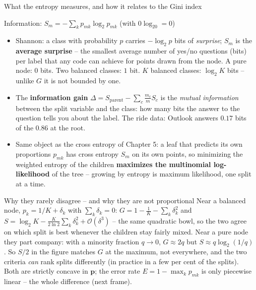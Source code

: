 \documentclass[10pt,aspectratio=169]{beamer}
\begin{document}
\begin{frame}{What the entropy measures, and how it relates to the Gini index}
\footnotesize
\begin{block}{Information: $S_m=-\sum_kp_{mk}\log_2p_{mk}$ (with $0\log_20=0$)}
\begin{itemize}
  \item Shannon: a class with probability $p$ carries $-\log_2p$ bits of
        \emph{surprise}; $S_m$ is the \textbf{average surprise} -- the
        smallest average number of yes/no questions (bits) per label that
        any code can achieve for points drawn from the node.  A pure node:
        $0$ bits.  Two balanced classes: $1$ bit.  $K$ balanced classes:
        $\log_2K$ bits -- unlike $G$ it is not bounded by one.
  \item The \textbf{information gain} $\Delta=S_{\mathrm{parent}}-\sum_c\frac{m_c}{m}S_c$
        is the \emph{mutual information} between the split variable and
        the class: how many bits the answer to the question tells you about
        the label.  The ride data: Outlook answers $0.17$ bits of the
        $0.86$ at the root.
  \item Same object as the cross entropy of Chapter 5: a leaf that predicts
        its own proportions $p_{mk}$ has cross entropy $S_m$ on its own
        points, so minimizing the weighted entropy of the children
        \textbf{maximizes the multinomial log-likelihood} of the tree --
        growing by entropy is maximum likelihood, one split at a time.
\end{itemize}
\end{block}
\begin{block}{Why they rarely disagree -- and why they are not proportional}
Near a balanced node, $p_k=1/K+\delta_k$ with $\sum_k\delta_k=0$:
$G=1-\tfrac1K-\sum_k\delta_k^2$ and
$S=\log_2K-\tfrac{K}{2\ln2}\sum_k\delta_k^2+\mathcal{O}(\delta^3)$ -- the
same quadratic bowl, so the two agree on which split is best whenever the
children stay fairly mixed.  Near a pure node they part company: with a
minority fraction $q\to0$, $G\approx2q$ but $S\approx q\log_2(1/q)$.  So
$S/2$ in the figure matches $G$ at the maximum, not everywhere, and the
two criteria \emph{can} rank splits differently (in practice in a few per
cent of the splits).  Both are strictly concave in $\bm{p}$; the error rate
$E=1-\max_kp_{mk}$ is only piecewise linear -- the whole difference (next frame).
\end{block}
\end{frame}
\end{document}
